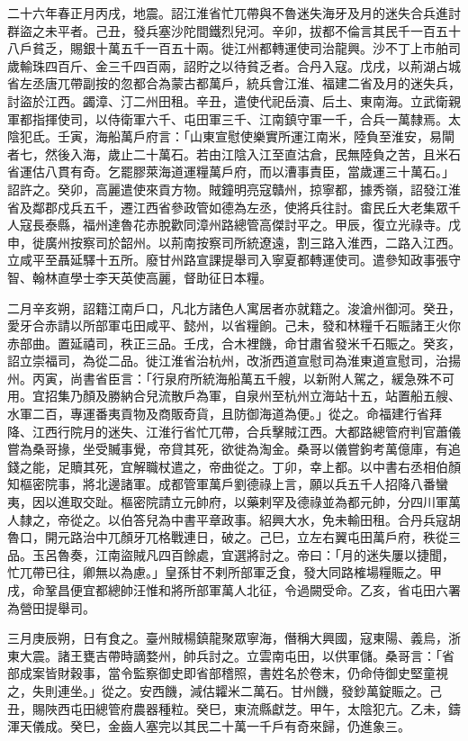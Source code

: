 \begin{pinyinscope}
 二十六年春正月丙戌，地震。詔江淮省忙兀帶與不魯迷失海牙及月的迷失合兵進討群盜之未平者。己丑，發兵塞沙陀間鐵烈兒河。辛卯，拔都不倫言其民千一百五十八戶貧乏，賜銀十萬五千一百五十兩。徙江州都轉運使司治龍興。沙不丁上市舶司歲輸珠四百斤、金三千四百兩，詔貯之以待貧乏者。合丹入寇。戊戌，以荊湖占城省左丞唐兀帶副按的忽都合為蒙古都萬戶，統兵會江淮、福建二省及月的迷失兵，討盜於江西。蠲漳、汀二州田租。辛丑，遣使代祀岳瀆、后土、東南海。立武衛親軍都指揮使司，以侍衛軍六千、屯田軍三千、江南鎮守軍一千，合兵一萬隸焉。太陰犯氐。壬寅，海船萬戶府言：「山東宣慰使樂實所運江南米，陸負至淮安，易閘者七，然後入海，歲止二十萬石。若由江陰入江至直沽倉，民無陸負之苦，且米石省運估八貫有奇。乞罷膠萊海道運糧萬戶府，而以漕事責臣，當歲運三十萬石。」詔許之。癸卯，高麗遣使來貢方物。賊鐘明亮寇贛州，掠寧都，據秀嶺，詔發江淮省及鄰郡戍兵五千，遷江西省參政管如德為左丞，使將兵往討。畬民丘大老集眾千人寇長泰縣，福州達魯花赤脫歡同漳州路總管高傑討平之。甲辰，復立光祿寺。戊申，徙廣州按察司於韶州。以荊南按察司所統遼遠，割三路入淮西，二路入江西。立咸平至聶延驛十五所。廢甘州路宣課提舉司入寧夏都轉運使司。遣參知政事張守智、翰林直學士李天英使高麗，督助征日本糧。



 二月辛亥朔，詔籍江南戶口，凡北方諸色人寓居者亦就籍之。浚滄州御河。癸丑，愛牙合赤請以所部軍屯田咸平、懿州，以省糧餉。己未，發和林糧千石賑諸王火你赤部曲。置延禧司，秩正三品。壬戌，合木裡饑，命甘肅省發米千石賑之。癸亥，詔立崇福司，為從二品。徙江淮省治杭州，改浙西道宣慰司為淮東道宣慰司，治揚州。丙寅，尚書省臣言：「行泉府所統海船萬五千艘，以新附人駕之，緩急殊不可用。宜招集乃顏及勝納合兒流散戶為軍，自泉州至杭州立海站十五，站置船五艘、水軍二百，專運番夷貢物及商販奇貨，且防御海道為便。」從之。命福建行省拜降、江西行院月的迷失、江淮行省忙兀帶，合兵擊賊江西。大都路總管府判官蕭儀嘗為桑哥掾，坐受贓事覺，帝貸其死，欲徙為淘金。桑哥以儀嘗鉤考萬億庫，有追錢之能，足贖其死，宜解職杖遣之，帝曲從之。丁卯，幸上都。以中書右丞相伯顏知樞密院事，將北邊諸軍。成都管軍萬戶劉德祿上言，願以兵五千人招降八番蠻夷，因以進取交趾。樞密院請立元帥府，以藥剌罕及德祿並為都元帥，分四川軍萬人隸之，帝從之。以伯答兒為中書平章政事。紹興大水，免未輸田租。合丹兵寇胡魯口，開元路治中兀顏牙兀格戰連日，破之。己巳，立左右翼屯田萬戶府，秩從三品。玉呂魯奏，江南盜賊凡四百餘處，宜選將討之。帝曰：「月的迷失屢以捷聞，忙兀帶已往，卿無以為慮。」皇孫甘不剌所部軍乏食，發大同路榷場糧賑之。甲戌，命鞏昌便宜都總帥汪惟和將所部軍萬人北征，令過闕受命。乙亥，省屯田六署為營田提舉司。



 三月庚辰朔，日有食之。臺州賊楊鎮龍聚眾寧海，僭稱大興國，寇東陽、義烏，浙東大震。諸王甕吉帶時謫婺州，帥兵討之。立雲南屯田，以供軍儲。桑哥言：「省部成案皆財穀事，當令監察御史即省部稽照，書姓名於卷末，仍命侍御史堅童視之，失則連坐。」從之。安西饑，減估糶米二萬石。甘州饑，發鈔萬錠賑之。己丑，賜陜西屯田總管府農器種粒。癸巳，東流縣獻芝。甲午，太陰犯亢。乙未，鑄渾天儀成。癸巳，金齒人塞完以其民二十萬一千戶有奇來歸，仍進象三。




\end{pinyinscope}
